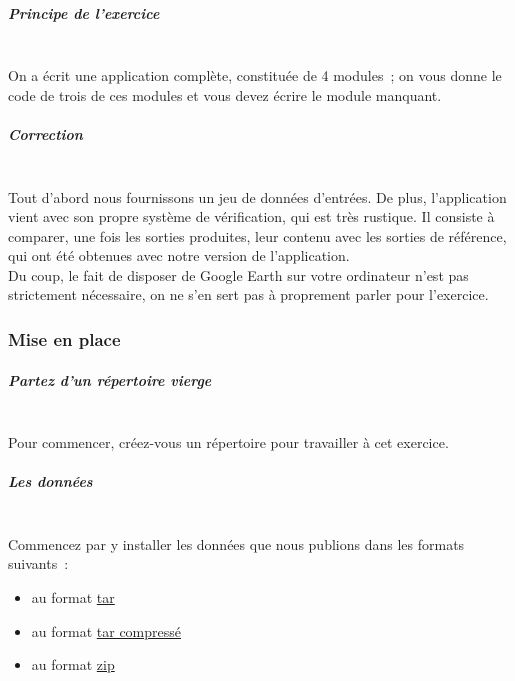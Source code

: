     \hypertarget{principe-de-lexercice}{%
\subparagraph{Principe de l'exercice\\\\}\label{principe-de-lexercice}}

    On a écrit une application complète, constituée de 4 modules~; on vous
donne le code de trois de ces modules et vous devez écrire le module
manquant.

    \hypertarget{correction}{%
\subparagraph{Correction\\\\}\label{correction}}

    Tout d'abord nous fournissons un jeu de données d'entrées. De plus,
l'application vient avec son propre système de vérification, qui est
très rustique. Il consiste à comparer, une fois les sorties produites,
leur contenu avec les sorties de référence, qui ont été obtenues avec
notre version de l'application.\\

Du coup, le fait de disposer de Google Earth sur votre ordinateur n'est
pas strictement nécessaire, on ne s'en sert pas à proprement parler pour
l'exercice.

\newpage
    \hypertarget{mise-en-place}{%
\subsubsection{Mise en place}\label{mise-en-place}}

    \hypertarget{partez-dun-ruxe9pertoire-vierge}{%
\subparagraph{Partez d'un répertoire
vierge\\\\}\label{partez-dun-ruxe9pertoire-vierge}}

    Pour commencer, créez-vous un répertoire pour travailler à cet exercice.

    \hypertarget{les-donnuxe9es}{%
\subparagraph{Les données\\\\}\label{les-donnuxe9es}}

    Commencez par y installer les données que nous publions dans les formats
suivants~:

\begin{itemize}
\tightlist
\item
  au format \href{data/ships-json.tar}{tar}
\item
  au format \href{data/ships-json.tgz}{tar compressé}
\item
  au format \href{data/ships-json.zip}{zip}
\end{itemize}

